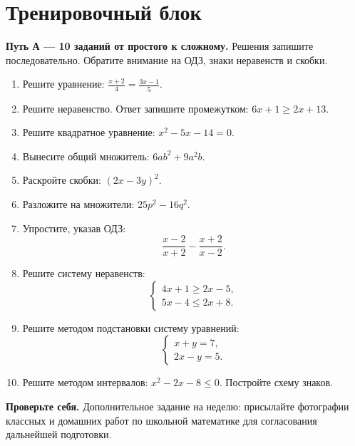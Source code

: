 \documentclass[a4paper,12pt]{article}
\newcommand{\attention}[1]{\textcolor{darkaccent}{\textbf{Проверьте себя.}} #1}
\begin{document}
\section*{Тренировочный блок}
\textcolor{darkaccent}{\textbf{Путь А --- 10 заданий от простого к сложному.}} Решения запишите последовательно. Обратите внимание на ОДЗ, знаки неравенств и скобки.
\begin{enumerate}
\item Решите уравнение: \(\displaystyle\frac{x+2}{4}=\frac{3x-1}{5}\).
\item Решите неравенство. Ответ запишите промежутком: \(6x+1\ge2x+13\).
\item Решите квадратное уравнение: \(x^2-5x-14=0\).
\item Вынесите общий множитель: \(6ab^2+9a^2b\).
\item Раскройте скобки: \((2x-3y)^2\).
\item Разложите на множители: \(25p^2-16q^2\).
\item Упростите, указав ОДЗ:
\[\frac{x-2}{x+2}-\frac{x+2}{x-2}.\]
\item Решите систему неравенств:
\[\begin{cases}4x+1\ge2x-5,\\5x-4\le2x+8.\end{cases}\]
\item Решите методом подстановки систему уравнений:
\[\begin{cases}x+y=7,\\2x-y=5.\end{cases}\]
\item Решите методом интервалов: \(x^2-2x-8\le0\). Постройте схему знаков.
\end{enumerate}
\vspace{7mm}
\attention{Дополнительное задание на неделю: присылайте фотографии классных и домашних работ по школьной математике для согласования дальнейшей подготовки.}
\clearpage
\end{document}
